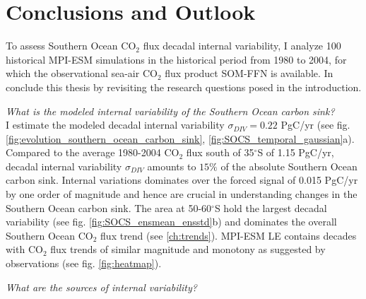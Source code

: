 \chapter{Conclusions and Outlook} \label{ch:conclusions}%

To assess Southern Ocean CO$_2$ flux decadal internal variability, I analyze 100 historical \acf{MPI-ESM} simulations in the historical period from 1980 to 2004, for which the observational sea-air CO$_2$ flux product \acs{SOM-FFN} is available. In conclude this thesis by revisiting the research questions posed in the introduction.\newline

\textit{What is the modeled internal variability of the Southern Ocean carbon sink?}\\

I estimate the modeled decadal internal variability $\sigma_{DIV}=0.22$ PgC/yr (see fig. \ref{fig:evolution_southern_ocean_carbon_sink}, \ref{fig:SOCS_temporal_gaussian}a). Compared to the average 1980-2004 CO$_2$ flux south of 35$^\circ$S of 1.15 PgC/yr, decadal internal variability $\sigma_{DIV}$ amounts to $15\%$ of the absolute Southern Ocean carbon sink. Internal variations dominates over the forced signal of 0.015 PgC/yr by one order of magnitude and hence are crucial in understanding changes in the Southern Ocean carbon sink. The area at 50-60$^\circ$S hold the largest decadal variability (see fig. \ref{fig:SOCS_ensmean_ensstd}b) and dominates the overall Southern Ocean CO$_2$ flux trend (see \autoref{ch:trends}). \acs{MPI-ESM LE} contains decades with CO$_2$ flux trends of similar magnitude and monotony as suggested by observations \citep{landschuetzer2015} (see fig. \ref{fig:heatmap}).\newline

\textit{What are the sources of internal variability?}\\

